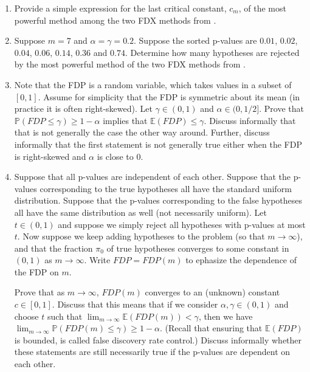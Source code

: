\documentclass[11pt]{article}
\theoremstyle{plain}
\theoremstyle{definition}
\newcommand{\pr}{\mathbb{P}}
\newcommand{\citt}{\citet}
\begin{document}
 \begin{enumerate}
 
 \item Provide a simple expression for  the last critical constant, $c_m$, of the most powerful  method among  the two FDX methods from \citt{lehmann2005generalizations}. 

 
 
 \item
Suppose $m=7$ and $\alpha=\gamma=0.2$. Suppose the sorted p-values are $0.01$, $0.02$, $0.04$, $0.06$, $0.14$, $0.36$ and $0.74$.
Determine how  many hypotheses are rejected by the most powerful method of the two FDX methods from \citt{lehmann2005generalizations}.



 \item Note that the  FDP is a random variable, which takes values in a subset of $[0,1]$.
 Assume for simplicity that the FDP is symmetric about its mean (in practice it is often right-skewed). Let $\gamma\in(0,1)$ and $ \alpha\in(0,1/2]$.
 Prove that $\pr(FDP\leq \gamma)\geq 1-\alpha$ implies that $\mathbb{E}(FDP)\leq \gamma$. 
 Discuss informally that that is not generally the case  the other way around.
 Further, discuss informally that the first statement is not generally true either when the FDP is right-skewed and $\alpha$ is close to 0.
 


 
 
 \item Suppose that all p-values are independent of each other. Suppose that the p-values corresponding to the true hypotheses all have the standard uniform distribution. Suppose that the p-values corresponding to the false hypotheses all have the same distribution as well (not necessarily uniform). Let $t\in (0,1)$ and suppose we simply reject all hypotheses with p-values at most $t$. Now suppose we keep adding hypotheses to the problem (so that $m\rightarrow\infty$), and that  the fraction $\pi_0$ of true hypotheses converges to some constant in $(0,1)$ as $m\rightarrow\infty$.
Write $FDP=FDP(m)$ to ephasize the dependence of the FDP on $m$. 

Prove that as $m\rightarrow\infty$, $FDP(m)$ converges to an (unknown) constant $c\in[0,1]$. Discuss that this  means that if we consider $\alpha, \gamma\in(0,1)$ and  choose $t$ such that $\lim_{m\rightarrow\infty} \mathbb{E}(FDP(m))< \gamma$, then we have $\lim_{m\rightarrow\infty} \pr(FDP(m)\leq \gamma)\geq 1-\alpha$.
 (Recall that ensuring that $\mathbb{E}(FDP)$ is bounded,  is called false discovery rate control.)
Discuss informally whether  these statements are  still necessarily true if the p-values are dependent on each other. 
 \end{enumerate}
 
\end{document}
